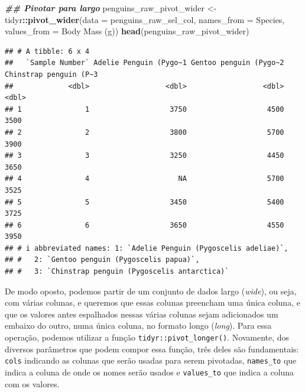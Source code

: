 \documentclass[
]{article}
\newenvironment{Shaded}{\begin{snugshade}}{\end{snugshade}}
\newcommand{\AttributeTok}[1]{\textcolor[rgb]{0.13,0.29,0.53}{#1}}
\newcommand{\DocumentationTok}[1]{\textcolor[rgb]{0.56,0.35,0.01}{\textbf{\textit{#1}}}}
\newcommand{\FunctionTok}[1]{\textcolor[rgb]{0.13,0.29,0.53}{\textbf{#1}}}
\newcommand{\NormalTok}[1]{#1}
\newcommand{\OtherTok}[1]{\textcolor[rgb]{0.56,0.35,0.01}{#1}}
\newcommand{\SpecialCharTok}[1]{\textcolor[rgb]{0.81,0.36,0.00}{\textbf{#1}}}
\newcommand{\StringTok}[1]{\textcolor[rgb]{0.31,0.60,0.02}{#1}}
\begin{document}
\begin{Shaded}
\begin{Highlighting}[]
\DocumentationTok{\#\# Pivotar para largo}
\NormalTok{penguins\_raw\_pivot\_wider }\OtherTok{\textless{}{-}}\NormalTok{ tidyr}\SpecialCharTok{::}\FunctionTok{pivot\_wider}\NormalTok{(}\AttributeTok{data =}\NormalTok{ penguins\_raw\_sel\_col, }
                                               \AttributeTok{names\_from =}\NormalTok{ Species, }
                                               \AttributeTok{values\_from =} \StringTok{\textasciigrave{}}\AttributeTok{Body Mass (g)}\StringTok{\textasciigrave{}}\NormalTok{)}
\FunctionTok{head}\NormalTok{(penguins\_raw\_pivot\_wider)}
\end{Highlighting}
\end{Shaded}

\begin{verbatim}
## # A tibble: 6 x 4
##   `Sample Number` Adelie Penguin (Pygo~1 Gentoo penguin (Pygo~2 Chinstrap penguin (P~3
##             <dbl>                  <dbl>                  <dbl>                  <dbl>
## 1               1                   3750                   4500                   3500
## 2               2                   3800                   5700                   3900
## 3               3                   3250                   4450                   3650
## 4               4                     NA                   5700                   3525
## 5               5                   3450                   5400                   3725
## 6               6                   3650                   4550                   3950
## # i abbreviated names: 1: `Adelie Penguin (Pygoscelis adeliae)`,
## #   2: `Gentoo penguin (Pygoscelis papua)`,
## #   3: `Chinstrap penguin (Pygoscelis antarctica)`
\end{verbatim}

De modo oposto, podemos partir de um conjunto de dados largo (\emph{wide}), ou seja, com várias colunas, e queremos que essas colunas preencham uma única coluna, e que os valores antes espalhados nessas várias colunas sejam adicionados um embaixo do outro, numa única coluna, no formato longo (\emph{long}). Para essa operação, podemos utilizar a função \texttt{tidyr::pivot\_longer()}. Novamente, dos diversos parâmetros que podem compor essa função, três deles são fundamentais: \texttt{cols} indicando as colunas que serão usadas para serem pivotadas, \texttt{names\_to} que indica a coluna de onde os nomes serão usados e \texttt{values\_to} que indica a coluna com os valores.
\end{document}
